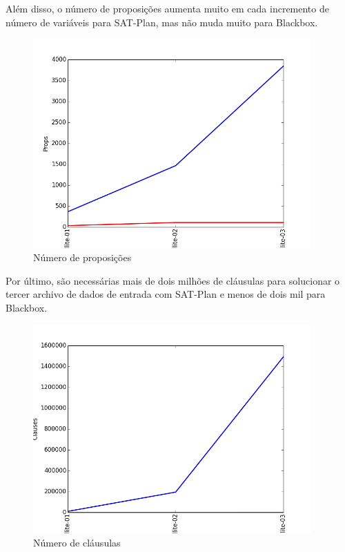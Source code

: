 	Além disso, o número de proposições aumenta muito em cada incremento de número de variáveis para SAT-Plan, mas não muda muito para Blackbox.
		\begin{figure}[H]
			\centering
			\includegraphics[height=8cm]{images/satellite_props}
			\caption{Número de proposições}
			\label{fig:satprops}
		\end{figure}
	Por último, são necessárias mais de dois milhões de cláusulas para solucionar o tercer archivo de dados de entrada com SAT-Plan e menos de dois mil para Blackbox.
		\begin{figure}[H]
			\centering
			\includegraphics[height=8cm]{images/satellite_clauses}
			\caption{Número de cláusulas}
			\label{fig:satclauses}
		\end{figure}
\newpage